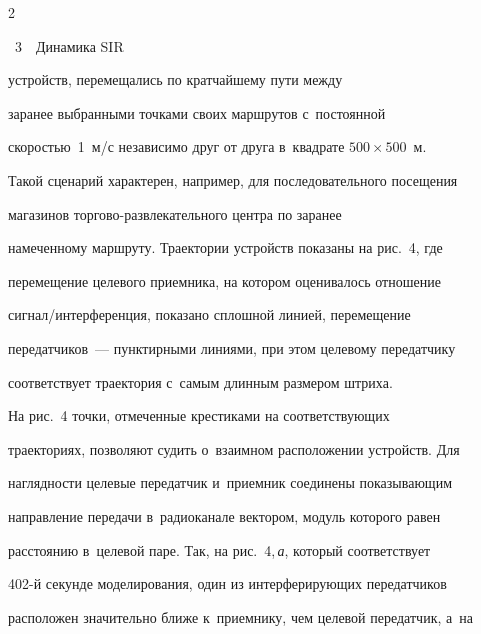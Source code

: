 \begin{multicols}{2}
{\begin{center}
\vspace*{6pt}





\noindent

{{\figurename~3}\ \ \small{Динамика SIR}}

\end{center}

}



\vspace*{6pt}



\addtocounter{figure}{1}



\noindent

 устройств, перемещались по кратчайшему пути между 

заранее выбранными точ\-ка\-ми своих маршрутов с~по\-сто\-ян\-ной 

ско\-ростью~1~м/с независимо друг от друга в~квад\-ра\-те $500\times500$~м. 

Такой сценарий характерен, например, для последовательного посещения 

магазинов тор\-го\-во-раз\-вле\-ка\-тель\-но\-го цент\-ра по заранее 

намеченному маршруту. Траектории устройств показаны на рис.~4, где 

перемещение целевого приемника, на котором оценивалось отношение 

сигнал/\-ин\-тер\-фе\-рен\-ция, показано сплош\-ной линией, перемещение 

передатчиков~--- пунктирными линиями, при этом целевому передатчику 

соответствует траектория с~самым длинным размером штриха. 

  

  На рис.~4 точки, отмеченные крестиками на соответствующих 

траекториях, позволяют судить о~взаимном расположении устройств. Для 

на\-гляд\-ности целевые передатчик и~приемник соединены показывающим 

на\-прав\-ле\-ние передачи в~радиоканале вектором, модуль которого равен 

рас\-сто\-янию в~целевой паре. Так, на рис.~4,\,\textit{а}, который соответствует 

402-й секунде моделирования, один из интерферирующих передатчиков 

расположен значительно ближе к~приемнику, чем целевой передатчик, а~на 


\end{multicols}

